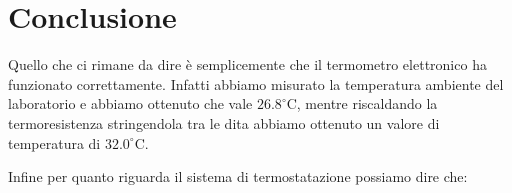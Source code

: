 \section*{Conclusione}

Quello che ci rimane da dire è semplicemente che il termometro elettronico ha funzionato correttamente. Infatti abbiamo misurato la temperatura ambiente del laboratorio e abbiamo ottenuto che vale $26.8^\circ$C, mentre riscaldando la termoresistenza stringendola tra le dita abbiamo ottenuto un valore di temperatura di $32.0^\circ$C.

Infine per quanto riguarda il sistema di termostatazione possiamo dire che: